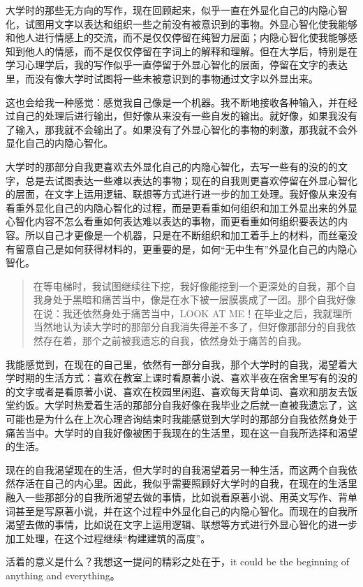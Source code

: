 \tristarsepline

大学时的那些无方向的写作，现在回顾起来，似乎一直在外显化自己的内隐心智化，试图用文字以表达和组织一些之前没有被意识到的事物。外显心智化使我能够和他人进行情感上的交流，而不是仅仅停留在纯智力层面；内隐心智化使我能够感知到他人的情感，而不是仅仅停留在字词上的解释和理解。但在大学后，特别是在学习心理学后，我的写作似乎一直停留于外显心智化的层面，停留在文字的表达里，而没有像大学时试图将一些未被意识到的事物通过文字以外显出来。

这也会给我一种感觉：感觉我自己像是一个机器。我不断地接收各种输入，并在经过自己的处理后进行输出，但好像从来没有一些自发的输出。就好像，如果我没有了输入，那我就不会输出了。如果没有了外显心智化的事物的刺激，那我就不会外显化自己的内隐心智化。

大学时的那部分自我更喜欢去外显化自己的内隐心智化，去写一些有的没的的文字，总是去试图表达一些难以表达的事物；现在的自我则更喜欢停留在外显心智化的层面，在文字上运用逻辑、联想等方式进行进一步的加工处理。我好像从来没有看重外显化自己的内隐心智化的过程，而是更看重如何组织和加工外显出来的外显心智化内容\pozhehao{}不怎么看重如何表达难以表达的事物，而更看重如何组织要表达的内容。所以自己才更像是一个机器，只是在不断组织和加工着手上的材料，而丝毫没有留意自己是如何获得材料的，更重要的是，如何“无中生有”\pozhehao{}外显化自己的内隐心智化。

\blockquote{
	在等电梯时，我试图继续往下挖，我好像能挖到一个更深处的自我，那个自我身处于黑暗和痛苦当中，像是在水下被一层膜裹成了一团。那个自我好像在说：我还依然身处于痛苦当中，LOOK AT ME！在毕业之后，我就理所当然地认为读大学时的那部分自我消失得差不多了，但好像那部分的自我依然存在着，那个之前被我遗忘的自我，依然身处于痛苦的自我。
}

我能感觉到，在现在的自己里，依然有一部分自我，那个大学时的自我，渴望着大学时期的生活方式：喜欢在教室上课时看原著小说、喜欢半夜在宿舍里写有的没的的文字或者是看原著小说、喜欢在校园里闲逛、喜欢每天背单词、喜欢和朋友去饭堂约饭。大学时热爱着生活的那部分自我好像在我毕业之后就一直被我遗忘了，这可能也是为什么在上次心理咨询结束时我能感觉到大学时的那部分自我依然身处于痛苦当中。大学时的自我好像被困于我现在的生活里，现在这一自我所选择和渴望的生活。

现在的自我渴望现在的生活，但大学时的自我渴望着另一种生活，而这两个自我依然存活在自己的内心里。因此，我似乎需要照顾好大学时的自我，在现在的生活里融入一些那部分的自我所渴望去做的事情，比如说看原著小说、用英文写作、背单词甚至是写原著小说，并在这个过程中外显化自己的内隐心智化。而现在的自我所渴望去做的事情，比如说在文字上运用逻辑、联想等方式进行外显心智化的进一步加工处理，在这个过程继续“构建建筑的高度”。

\tristarsepline

活着的意义是什么？我想这一提问的精彩之处在于，it could be the beginning of anything and everything。
